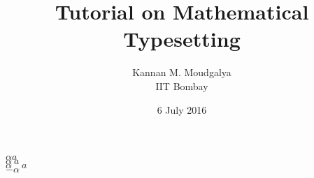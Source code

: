 \documentclass[12pt,a5paper]{article}
\title{Tutorial on Mathematical Typesetting}
\author{Kannan M. Moudgalya \\ IIT Bombay}
\date{6 July 2016}
\begin{document}
\maketitle
$\alpha a$ \\
$\alpha \ a$ \\
$\alpha \quad a$  \\

$-\alpha$
\end{document}
